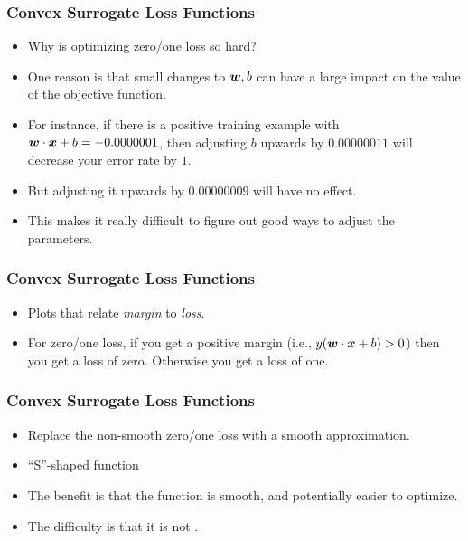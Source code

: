 \documentclass[trans]{beamer}
\begin{document}
\begin{frame}
  \frametitle{Convex Surrogate Loss Functions}
\begin{itemize}
\item 
Why is optimizing zero/one loss so hard?  
\item One reason is that small changes to ${\boldsymbol{w}},b$ can have a large impact on
the value of the objective function. 
\item For instance, if there is a
positive training example with ${\boldsymbol{w}} \cdot {\boldsymbol{x}}+b = -0.0000001$, then
adjusting $b$ upwards by $0.00000011$ will decrease your error rate by
$1$. 
\item But adjusting it upwards by $0.00000009$ will have no effect.
\item This makes it really difficult to figure out good ways to adjust the
parameters.
\end{itemize}
\end{frame}

\begin{frame}
  \frametitle{Convex Surrogate Loss Functions}
\begin{itemize}
\item 
Plots that relate
\emph{margin} to \emph{loss}.
\item For zero/one loss, if you get a positive margin (i.e., $y({\boldsymbol{w}} \cdot {\boldsymbol{x}}+b)>0$)
then you get a loss of zero.  Otherwise you get a loss of one. 
\end{itemize}
\end{frame}

\begin{frame}
  \frametitle{Convex Surrogate Loss Functions}
\begin{itemize}
\item Replace the non-smooth zero/one loss with a smooth approximation.
\item  ``S''-shaped
function 
\item The
benefit  is that the function is smooth, and
potentially easier to optimize. 
\item The difficulty is that it is not
.
\end{itemize}
\end{frame}
\end{document}
